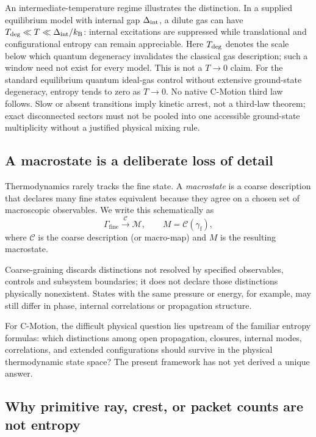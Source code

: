 \documentclass[11pt]{article}
\theoremstyle{definition}
\newcommand{\cmotion}{\mbox{C-Motion}}
\newcommand{\kb}{k_{\mathrm B}}
\newcommand{\GammaFine}{\Gamma_{\mathrm{fine}}}
\begin{document}
An intermediate-temperature regime illustrates the distinction. In a supplied
equilibrium model with internal gap $\Delta_{\rm int}$, a dilute gas can have
$T_{\rm deg}\ll T\ll\Delta_{\rm int}/\kb$: internal excitations are suppressed
while translational and configurational entropy can remain appreciable.
Here $T_{\rm deg}$ denotes the scale below which quantum degeneracy invalidates
the classical gas description; such a window need not exist for every model.
This is not a $T\to0$ claim. For the standard equilibrium quantum ideal-gas
control without extensive ground-state degeneracy, entropy tends to zero
as $T\to0$. No native C-Motion third law follows.
Slow or absent transitions imply kinetic arrest, not a third-law theorem;
exact disconnected sectors must not be pooled into one accessible ground-state
multiplicity without a justified physical mixing rule.

\subsection{A macrostate is a deliberate loss of detail}

Thermodynamics rarely tracks the fine state.  A \emph{macrostate} is a coarse description
that declares many fine states equivalent because they agree on a chosen set of
macroscopic observables.  We write this schematically as
\begin{equation}
  \GammaFine \xrightarrow{\ \mathcal C\ } \mathcal M,
  \qquad
  M=\mathcal C(\gamma_{\mathrm f}),
  \label{eq:macro-map-simple}
\end{equation}
where $\mathcal C$ is the coarse description (or macro-map) and $M$ is the resulting
macrostate.

Coarse-graining discards distinctions not resolved by specified observables,
controls and subsystem boundaries; it does not declare those distinctions
physically nonexistent.  States with the same pressure or energy, for example,
may still differ in phase, internal correlations or propagation structure.

For \cmotion{}, the difficult physical question lies upstream of the familiar entropy
formulas: which distinctions among open propagation, closures, internal modes,
correlations, and extended configurations should survive in the physical thermodynamic
state space?  The present framework has not yet derived a unique answer.

\subsection{Why primitive ray, crest, or packet counts are not entropy}
\end{document}
